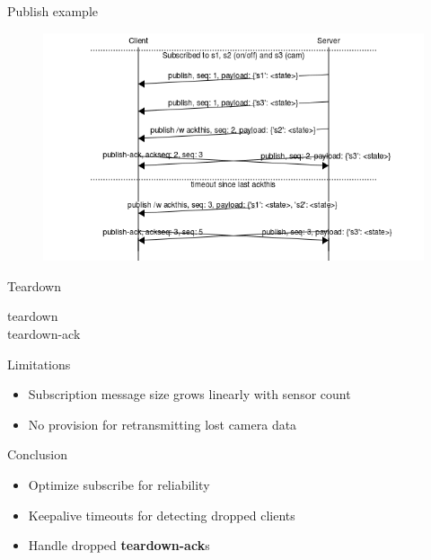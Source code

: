 \documentclass{beamer}
\begin{document}
\begin{frame}{Publish example}
\begin{figure}
	\includegraphics[width=\textwidth]{figures/publish_normal.png}
\end{figure}
\end{frame}

\begin{frame}{Teardown}
\begin{description}
	\item[teardown]
    \item[teardown-ack]
\end{description}
\end{frame}

\begin{frame}{Limitations}
\begin{itemize}
	\item Subscription message size grows linearly with sensor count
    \item No provision for retransmitting lost camera data
\end{itemize}
\end{frame}

\begin{frame}{Conclusion}
\begin{itemize}
	\item Optimize subscribe for reliability
    \item Keepalive timeouts for detecting dropped clients
    \item Handle dropped \textbf{teardown-ack}s
\end{itemize}
\end{frame}
\end{document}
